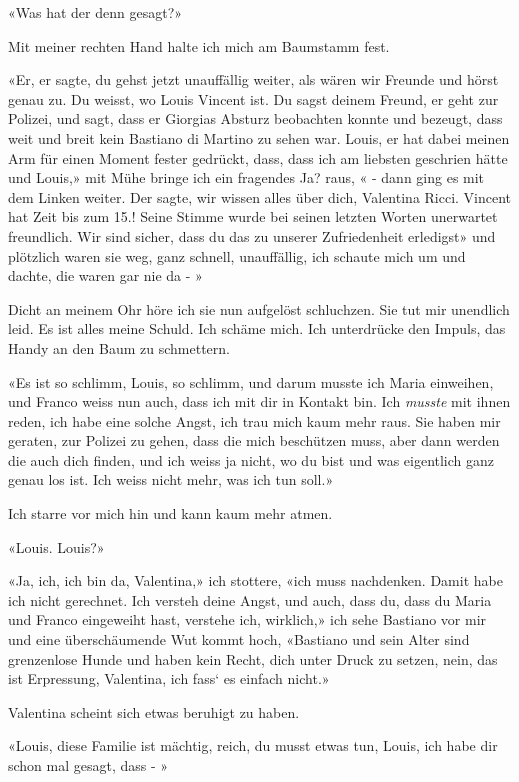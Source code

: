 «Was hat der denn gesagt?»

Mit meiner rechten Hand halte ich mich am Baumstamm fest.

«Er, er sagte, du gehst jetzt unauffällig weiter, als wären wir Freunde
und hörst genau zu. Du weisst, wo Louis Vincent ist. Du sagst deinem
Freund, er geht zur Polizei, und sagt, dass er
Giorgias Absturz beobachten konnte und bezeugt, dass weit und breit kein
Bastiano di Martino zu sehen war. Louis, er hat dabei meinen Arm für
einen Moment fester gedrückt, dass, dass ich am liebsten geschrien hätte
und Louis,» mit Mühe bringe ich ein fragendes Ja? raus, « - dann ging es
mit dem Linken weiter. Der sagte, wir wissen alles über dich, Valentina
Ricci. Vincent hat Zeit bis zum 15.! Seine Stimme wurde bei seinen
letzten Worten unerwartet freundlich. Wir sind sicher, dass du das zu
unserer Zufriedenheit erledigst» und plötzlich waren sie weg, ganz
schnell, unauffällig, ich schaute mich um und dachte, die waren gar nie
da - »

Dicht an meinem Ohr höre ich sie nun aufgelöst schluchzen. Sie tut mir
unendlich leid. Es ist alles meine Schuld. Ich schäme mich. Ich
unterdrücke den Impuls, das Handy an den Baum zu schmettern.

«Es ist so schlimm, Louis, so schlimm, und darum musste ich Maria
einweihen, und Franco weiss nun auch, dass ich mit dir in Kontakt bin.
Ich \emph{musste} mit ihnen reden, ich habe eine solche Angst, ich trau
mich kaum mehr raus. Sie haben mir geraten, zur Polizei zu gehen, dass
die mich beschützen muss, aber dann werden die auch dich finden, und ich
weiss ja nicht, wo du bist und was eigentlich ganz genau los ist. Ich
weiss nicht mehr, was ich tun soll.»

Ich starre vor mich hin und kann kaum mehr atmen.

«Louis. Louis?»

«Ja, ich, ich bin da, Valentina,» ich stottere, «ich muss nachdenken.
Damit habe ich nicht gerechnet. Ich versteh deine Angst, und auch, dass
du, dass du Maria und Franco eingeweiht hast, verstehe ich, wirklich,»
ich sehe Bastiano vor mir und eine überschäumende Wut kommt hoch,
«Bastiano und sein Alter sind grenzenlose Hunde und haben kein Recht,
dich unter Druck zu setzen, nein, das ist Erpressung, Valentina, ich
fass` es einfach nicht.»

Valentina scheint sich etwas beruhigt zu haben. 

«Louis, diese Familie ist mächtig, reich, du musst etwas tun, Louis, ich
habe dir schon mal gesagt, dass - »

